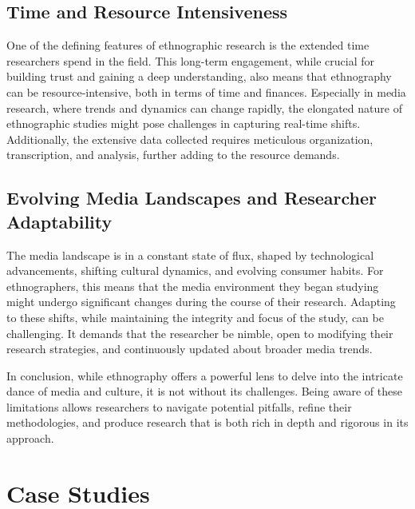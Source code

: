 \documentclass[
  b5paper]{book}
\begin{document}
\hypertarget{time-and-resource-intensiveness}{%
\subsection*{Time and Resource Intensiveness}\label{time-and-resource-intensiveness}}

One of the defining features of ethnographic research is the extended time researchers spend in the field. This long-term engagement, while crucial for building trust and gaining a deep understanding, also means that ethnography can be resource-intensive, both in terms of time and finances. Especially in media research, where trends and dynamics can change rapidly, the elongated nature of ethnographic studies might pose challenges in capturing real-time shifts. Additionally, the extensive data collected requires meticulous organization, transcription, and analysis, further adding to the resource demands.

\hypertarget{evolving-media-landscapes-and-researcher-adaptability}{%
\subsection*{Evolving Media Landscapes and Researcher Adaptability}\label{evolving-media-landscapes-and-researcher-adaptability}}

The media landscape is in a constant state of flux, shaped by technological advancements, shifting cultural dynamics, and evolving consumer habits. For ethnographers, this means that the media environment they began studying might undergo significant changes during the course of their research. Adapting to these shifts, while maintaining the integrity and focus of the study, can be challenging. It demands that the researcher be nimble, open to modifying their research strategies, and continuously updated about broader media trends.

In conclusion, while ethnography offers a powerful lens to delve into the intricate dance of media and culture, it is not without its challenges. Being aware of these limitations allows researchers to navigate potential pitfalls, refine their methodologies, and produce research that is both rich in depth and rigorous in its approach.

\hypertarget{case-studies-1}{%
\section{Case Studies}\label{case-studies-1}}
\end{document}
